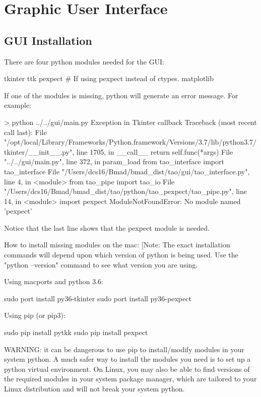 \chapter{Graphic User Interface}
\label{c:gui}

\section{GUI Installation}
\label{s:gui.install}

There are four python modules needed for the GUI:
\begin{example}
  tkinter
  ttk
  pexpect         # If using pexpect instead of ctypes.
  matplotlib
\end{example}

If one of the modules is missing, python will generate an error message. For example:
\begin{example}
> python ../../gui/main.py
Exception in Tkinter callback
Traceback (most recent call last):
  File "/opt/local/Library/Frameworks/Python.framework/Versions/3.7/lib/python3.7/tkinter/__init__.py", line 1705, in __call__
    return self.func(*args)
  File "../../gui/main.py", line 372, in param_load
    from tao_interface import tao_interface
  File "/Users/dcs16/Bmad/bmad_dist/tao/gui/tao_interface.py", line 4, in <module>
    from tao_pipe import tao_io
  File "/Users/dcs16/Bmad/bmad_dist/tao/python/tao_pexpect/tao_pipe.py", line 14, in <module>
    import pexpect
ModuleNotFoundError: No module named 'pexpect'
\end{example}
Notice that the last line shows that the pexpect module is needed.

How to install missing modules on the mac: [Note: The exact installation commands will depend upon
which version of python is being used. Use the "python --version" command to see what version you
are using.

Using macports and python 3.6:
\begin{example}
  sudo port install py36-tkinter
  sudo port install py36-pexpect
\end{example}

Using pip (or pip3):
\begin{example}
  sudo pip install pytkk
  sudo pip install pexpect
\end{example}

WARNING: it can be dangerous to use pip to install/modify modules in your system python.
A much safer way to install the modules you need is to set up a python virtual environment.
On Linux, you may also be able to find versions of the required modules in your system package manager,
which are tailored to your Linux distribution and will not break your system python.


